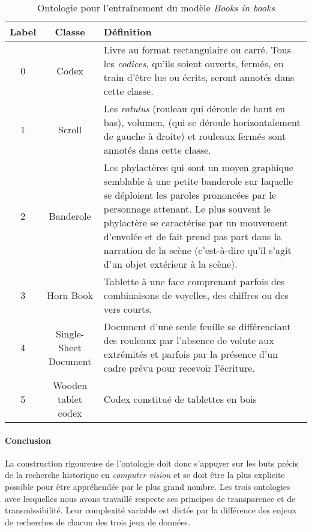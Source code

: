 \documentclass[12pt,twoside]{book}
\begin{document}
\begin{center}
    \begin{table}[h]
    \centering
    \begin{tabular}{|c|c|p{12cm}|}
    \hline
    \textbf{Label} & \textbf{Classe} & \textbf{Définition}  \\
    \hline
    0 & Codex &  Livre au format rectangulaire ou carré. Tous les \textit{codices}, qu’ils soient ouverts, fermés, en train d’être lus ou écrits, seront annotés dans cette classe.\\ 
    \hline
    1 & Scroll &  Les \textit{rotulus} (rouleau qui déroule de haut en bas), volumen, (qui se déroule horizontalement de gauche à droite) et rouleaux fermés sont annotés dans cette classe.\\ 
    \hline
    2 & Banderole & Les phylactères qui sont un moyen graphique semblable à une petite banderole sur laquelle se déploient les paroles prononcées par le personnage attenant. Le plus souvent le phylactère se caractérise par un mouvement d’envolée et de fait prend pas part dans la narration de la scène (c’est-à-dire qu’il s’agit d’un objet extérieur à la scène). \\ 
    \hline
    3 & Horn Book  & Tablette à une face comprenant parfois des combinaisons de voyelles, des chiffres ou des vers courts. \\ 
    \hline
    4 & Single-Sheet Document & Document d'une seule feuille se différenciant des rouleaux par l’absence de volute aux extrémités et parfois par la présence d’un cadre prévu pour recevoir l’écriture. \\ 
    \hline
    5 & Wooden tablet codex  & Codex constitué de tablettes en bois \\ 
    \hline
\end{tabular}
\caption{Ontologie pour l'entraînement du modèle \textit{Books in books}}
\end{table}
\end{center} 

\paragraph{Conclusion}
La construction rigoureuse de l’ontologie doit donc s’appuyer sur les buts précis de la recherche historique en \textit{computer vision} et se doit être la plus explicite possible pour être appréhendée par le plus grand nombre. Les trois ontologies avec lesquelles nous avons travaillé respecte ses principes de transparence et de transmissibilité. Leur complexité variable est dictée par la différence des enjeux de recherches de chacun des trois jeux de données.
\end{document}
